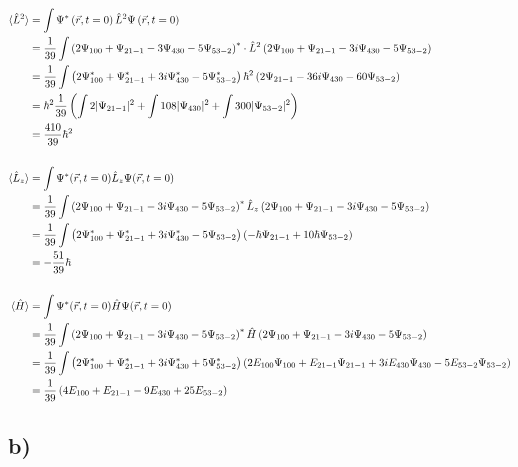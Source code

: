     \begin{align*}
        \langle \hat{L}^2 \rangle &= \int \Psi^*\left( \vec{r},t=0 \right) \hat{L}^2 \Psi\left( \vec{r},t=0 \right)\\
        &= \frac{1}{39} \int \left( 2\Psi_{100} + \Psi_{21-1} - 3\Psi_{430} - 5\Psi_{53-2} \right)^* \cdot \hat{L}^2 \left( 2\Psi_{100} + \Psi_{21-1} - 3i\Psi_{430} - 5\Psi_{53-2} \right)\\
        &= \frac{1}{39} \int \left( 2\Psi_{100}^* + \Psi_{21-1}^* + 3i\Psi_{430}^* - 5\Psi_{53-2}^* \right) \hbar^2 \left( 2\Psi_{21-1} - 36i\Psi_{430} - 60\Psi_{53-2} \right)\\
        &= \hbar^2 \frac{1}{39} \left( \int 2\lvert\Psi_{21-1}\rvert^2 + \int 108\lvert\Psi_{430}\rvert^2 + \int 300\lvert\Psi_{53-2}\rvert^2 \right)\\
        &= \frac{410}{39} \hbar^2\\
        \\
        \langle \hat{L}_z \rangle &= \int \Psi^*(\vec{r},t=0) \hat{L}_z \Psi(\vec{r},t=0)\\
        &= \frac{1}{39} \int \left( 2\Psi_{100} + \Psi_{21-1} - 3i\Psi_{430} - 5\Psi_{53-2} \right)^* \hat{L}_z \left( 2\Psi_{100} + \Psi_{21-1} - 3i\Psi_{430} - 5\Psi_{53-2} \right)\\
        &= \frac{1}{39} \int \left( 2\Psi_{100}^* + \Psi_{21-1}^* + 3i\Psi_{430}^* - 5\Psi_{53-2} \right) \left( -\hbar\Psi_{21-1} + 10\hbar\Psi_{53-2} \right)\\
        &= -\frac{51}{39} \hbar\\
        \\
        \langle \hat{H} \rangle &= \int \Psi^*(\vec{r},t=0) \hat{H} \Psi(\vec{r},t=0)\\
        &= \frac{1}{39} \int \left( 2\Psi_{100} + \Psi_{21-1} - 3i\Psi_{430} - 5\Psi_{53-2} \right)^* \hat{H} \left( 2\Psi_{100} + \Psi_{21-1} - 3i\Psi_{430} - 5\Psi_{53-2} \right)\\
        &= \frac{1}{39} \int \left( 2\Psi_{100}^* + \Psi_{21-1}^* + 3i\Psi_{430}^* + 5\Psi_{53-2}^* \right) \left( 2E_{100}\Psi_{100} + E_{21-1}\Psi_{21-1} + 3iE_{430}\Psi_{430} - 5E_{53-2}\Psi_{53-2} \right)\\
        &= \frac{1}{39} \left( 4E_{100} + E_{21-1} - 9E_{430} + 25E_{53-2} \right)
    \end{align*}

\subsection{b)}

